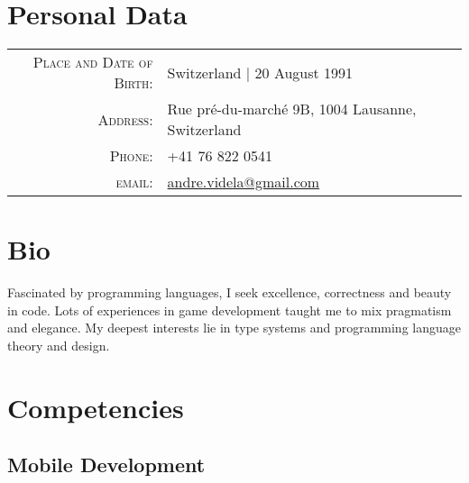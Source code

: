 \documentclass[a4paper,10pt]{article} %
\begin{document}
\pagestyle{empty} %


\par{\bigskip\par} %
\par{\bigskip\par} %
\section{Personal Data}

\begin{tabular}{rl}
\textsc{Place and Date of Birth:} & Switzerland  | 20 August 1991 \\
\textsc{Address:} & Rue pré-du-marché 9B, 1004 Lausanne, Switzerland \\
\textsc{Phone:} & +41 76 822 0541\\
\textsc{email:} & \href{mailto:andre.videla@gmail.com}{andre.videla@gmail.com}
\end{tabular}


\section{Bio}
Fascinated by programming languages, I seek excellence, correctness and beauty in code. Lots of experiences in game development taught me to mix pragmatism and elegance. My deepest interests lie in type systems and programming language theory and design.


\section{Competencies}

\subsection{Mobile Development}
\end{document}
